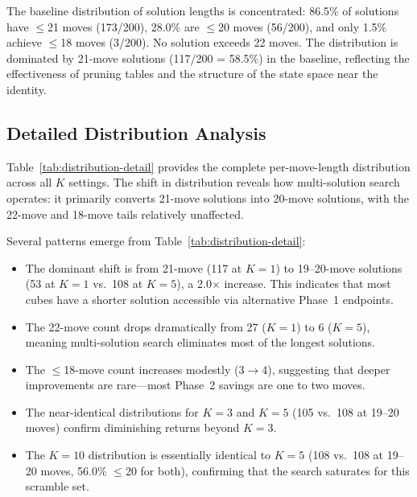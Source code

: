 \documentclass[conference]{IEEEtran}
\begin{document}
The baseline distribution of solution lengths is concentrated: 86.5\% of solutions have $\leq$21 moves (173/200), 28.0\% are $\leq$20 moves (56/200), and only 1.5\% achieve $\leq$18 moves (3/200). No solution exceeds 22 moves. The distribution is dominated by 21-move solutions (117/200 = 58.5\%) in the baseline, reflecting the effectiveness of pruning tables and the structure of the state space near the identity.

\subsection{Detailed Distribution Analysis}
\label{sec:distribution-detail}

Table~\ref{tab:distribution-detail} provides the complete per-move-length distribution across all $K$ settings. The shift in distribution reveals how multi-solution search operates: it primarily converts 21-move solutions into 20-move solutions, with the 22-move and 18-move tails relatively unaffected.

\begin{table}[htbp]
\centering
\caption{Per-move-length distribution across $K$ settings (200 scrambles, seed 42).}
\label{tab:distribution-detail}
\end{table}
\FloatBarrier

Several patterns emerge from Table~\ref{tab:distribution-detail}:
\begin{itemize}[leftmargin=*]
  \item The dominant shift is from 21-move (117 at $K{=}1$) to 19--20-move solutions (53 at $K{=}1$ vs.\ 108 at $K{=}5$), a 2.0$\times$ increase. This indicates that most cubes have a shorter solution accessible via alternative Phase~1 endpoints.
  \item The 22-move count drops dramatically from 27 ($K{=}1$) to 6 ($K{=}5$), meaning multi-solution search eliminates most of the longest solutions.
  \item The $\leq$18-move count increases modestly (3$\to$4), suggesting that deeper improvements are rare---most Phase~2 savings are one to two moves.
  \item The near-identical distributions for $K{=}3$ and $K{=}5$ (105 vs.\ 108 at 19--20 moves) confirm diminishing returns beyond $K{=}3$.
  \item The $K{=}10$ distribution is essentially identical to $K{=}5$ (108 vs.\ 108 at 19--20 moves, 56.0\% $\leq$20 for both), confirming that the search saturates for this scramble set.
\end{itemize}
\end{document}
